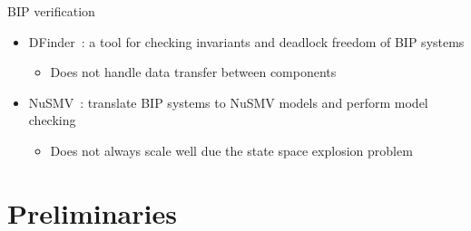 \begin{frame}{BIP verification}
    \begin{itemize}
     \item DFinder~\cite{dfinder}: a tool for checking invariants and deadlock freedom of BIP systems
      \begin{itemize}
       \item Does not handle data transfer between components
      \end{itemize}
     \item NuSMV~\cite{nusmv}: translate BIP systems to NuSMV models and perform model checking
      \begin{itemize}
       \item Does not always scale well due the state space explosion problem 
      \end{itemize}
    \end{itemize}
\end{frame}




\section{Preliminaries}


\section{\mytool{}}


\section{\biptool{}}


